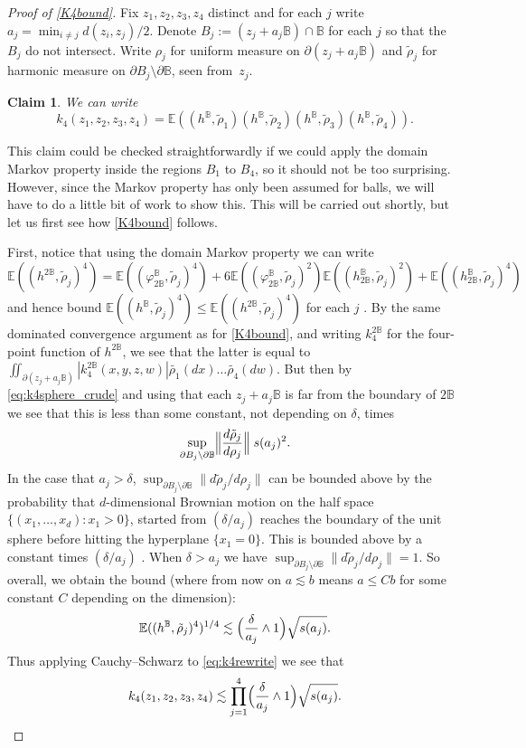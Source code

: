 \documentclass[JEP,XML,SOM,Unicode,published]{cedram}
\newtheorem{claim}[theorem]{Claim}
\theoremstyle{definition}
\newcommand{\E}{\mathbb{E}}
\newcommand{\B}{\mathbb{B}}\let\D\B\let\Ub\B
\begin{document}
\begin{proof}[Proof of \eqref{K4bound}] Fix $z_1,z_2,z_3,z_4$ distinct and for each $j$ write $a_j\!=\!\min_{i\ne j} d(z_i,z_j)/2$.
Denote $B_j:=(z_j+a_j\B)\cap \B$ for each $j$ so that the $B_j$ do not intersect. Write $\rho_j$ for uniform measure on $\partial(z_j+a_j\B)$ and $\tilde{\rho}_j$ for harmonic measure on $\partial B_j\setminus \partial \B$, seen from~$z_j$.

\begin{claim}\label{claim:4mt} We can write
\begin{equation}\label{eq:k4rewrite}k_4(z_1,z_2,z_3,z_4)=\E((h^\B,\tilde{\rho}_1)(h^\B,\tilde{\rho}_2)(h^\B,\tilde{\rho}_3)(h^\B,\tilde{\rho}_4)).\end{equation}
\end{claim}
 This claim could be checked straightforwardly if we could apply the domain Markov property inside the regions $B_1$ to $B_4$, so it should not be too surprising. However, since the Markov property has only been assumed for balls, we will have to do a little bit of work to show this. This will be carried out shortly, but let us first see how \eqref{K4bound} follows.

First, notice that using the domain Markov property we can write
\[
\E((h^{2\B},\tilde\rho_j)^4)=\E((\varphi^{\B}_{2\B},\tilde{\rho}_j)^4)+6\E((\varphi^{\B}_{2\B},\tilde{\rho}_j)^2)\E((h^\B_{2\B},\tilde{\rho}_j)^2)+\E((h^\B_{2\B},\tilde{\rho}_j)^4)
\]
and hence bound $\E((h^\B,\tilde{\rho}_j)^4)\le \E((h^{2\B},\tilde{\rho}_j)^4)$ for each $j$ . By the same dominated convergence argument as for \eqref{K4bound}, and writing $k_4^{2\B}$ for the four-point function of $h^{2\B}$, we see that the latter is equal to $\iint_{\partial (z_j+a_j\B)} |k_4^{2\B}(x,y,z,w)| \tilde{\rho_1}(dx)\dots \tilde{\rho_4}(dw)$. But then by \eqref{eq:k4sphere_crude} and using that each $z_j+a_j\B$ is far from the boundary of $2\B$ we see that this is less than some constant, not depending on $\delta$, times
\begin{equation}\label{density_sup}
\sup_{\partial B_j\setminus \partial \B} \Bigl\|\frac{d\tilde{\rho}_j}{d\rho_j}\Bigr\| \; s(a_j)^2.
\end{equation}
In the case that $a_j>\delta$, $\sup_{\partial B_j\setminus \partial \B} \|d\tilde{\rho}_j/d\rho_j\|$ can be bounded above by the probability that $d$-dimensional Brownian motion on the half space $\{(x_1,\dots, x_d): x_1>0\}$, started from $(\delta/a_j)$ reaches the boundary of the unit sphere before hitting the hyperplane $\{x_1=0\}$. This is bounded above by a constant times $(\delta/a_j)$ \cite[Th.\,4.4]{Burdzy}. When $\delta>a_j$ we have {$\sup_{\partial B_j\setminus \partial \B} \|d\tilde{\rho}_j/d\rho_j\|=1$}. So overall, we obtain the bound (where from now on $a\lesssim b$ means $a\le C b$ for some constant $C$ depending on the dimension):\vspace*{-3pt}
\[
\E((h^\B,\tilde{\rho}_j)^4)^{1/4}\lesssim \Bigl(\frac{\delta}{a_j}\wedge 1\Bigr)\sqrt{s(a_j)}.
\]
Thus applying Cauchy--Schwarz to \eqref{eq:k4rewrite} we see that\vspace*{-3pt}
\[
k_4(z_1,z_2,z_3,z_4)\lesssim \prod_{j=1}^4 \Bigl(\frac{\delta}{a_j}\wedge 1\Bigr) \sqrt{s(a_j)}.
\]


\end{proof}
\end{document}
